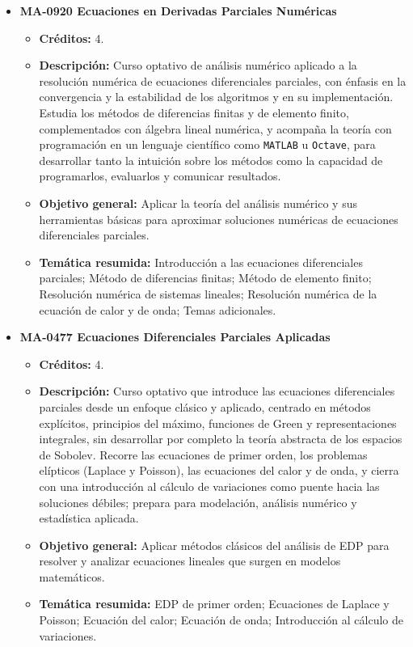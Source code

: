 \begin{itemize}[leftmargin=1.3em, itemsep=10pt, topsep=4pt, label={\color{Azul-UCR}$\blacksquare$}]
\item {\color{Azul-UCR}\textbf{MA-0920 Ecuaciones en Derivadas Parciales Numéricas}}\par\nopagebreak\smallskip
\begin{itemize}[leftmargin=1.1em, itemsep=3pt, topsep=2pt, parsep=2pt, label={\textendash}]
\item \textbf{Créditos:} 4.
\item \textbf{Descripción:} Curso optativo de análisis numérico aplicado a la resolución numérica de ecuaciones diferenciales parciales, con énfasis en la convergencia y la estabilidad de los algoritmos y en su implementación. Estudia los métodos de diferencias finitas y de elemento finito, complementados con álgebra lineal numérica, y acompaña la teoría con programación en un lenguaje científico como \texttt{MATLAB} u \texttt{Octave}, para desarrollar tanto la intuición sobre los métodos como la capacidad de programarlos, evaluarlos y comunicar resultados.
\item \textbf{Objetivo general:} Aplicar la teoría del análisis numérico y sus herramientas básicas para aproximar soluciones numéricas de ecuaciones diferenciales parciales.
\item \textbf{Temática resumida:} Introducción a las ecuaciones diferenciales parciales; Método de diferencias finitas; Método de elemento finito; Resolución numérica de sistemas lineales; Resolución numérica de la ecuación de calor y de onda; Temas adicionales.
\end{itemize}

\item {\color{Azul-UCR}\textbf{MA-0477 Ecuaciones Diferenciales Parciales Aplicadas}}\par\nopagebreak\smallskip
\begin{itemize}[leftmargin=1.1em, itemsep=3pt, topsep=2pt, parsep=2pt, label={\textendash}]
\item \textbf{Créditos:} 4.
\item \textbf{Descripción:} Curso optativo que introduce las ecuaciones diferenciales parciales desde un enfoque clásico y aplicado, centrado en métodos explícitos, principios del máximo, funciones de Green y representaciones integrales, sin desarrollar por completo la teoría abstracta de los espacios de Sobolev. Recorre las ecuaciones de primer orden, los problemas elípticos (Laplace y Poisson), las ecuaciones del calor y de onda, y cierra con una introducción al cálculo de variaciones como puente hacia las soluciones débiles; prepara para modelación, análisis numérico y estadística aplicada.
\item \textbf{Objetivo general:} Aplicar métodos clásicos del análisis de EDP para resolver y analizar ecuaciones lineales que surgen en modelos matemáticos.
\item \textbf{Temática resumida:} EDP de primer orden; Ecuaciones de Laplace y Poisson; Ecuación del calor; Ecuación de onda; Introducción al cálculo de variaciones.
\end{itemize}


\end{itemize}
